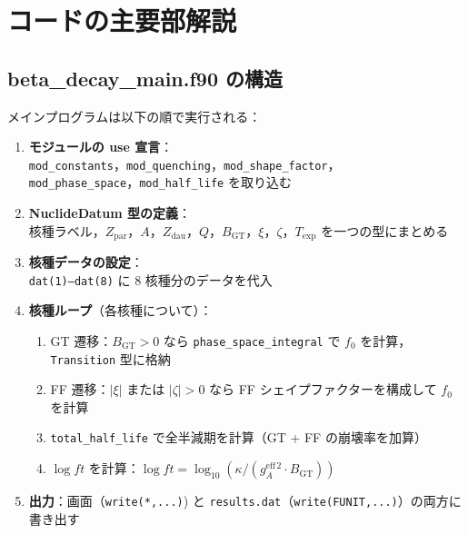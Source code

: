 \documentclass[12pt,a4paper]{ltjsarticle}
\begin{document}
\section{コードの主要部解説}

\subsection{beta\_decay\_main.f90 の構造}

メインプログラムは以下の順で実行される：

\begin{enumerate}
  \item \textbf{モジュールの use 宣言}：\\
        \texttt{mod\_constants}，\texttt{mod\_quenching}，\texttt{mod\_shape\_factor}，\\
        \texttt{mod\_phase\_space}，\texttt{mod\_half\_life} を取り込む

  \item \textbf{NuclideDatum 型の定義}：\\
        核種ラベル，$Z_\text{par}$，$A$，$Z_\text{dau}$，$Q$，$B_\text{GT}$，$\xi$，$\zeta$，$T_\text{exp}$ を一つの型にまとめる

  \item \textbf{核種データの設定}：\\
        \texttt{dat(1)--dat(8)} に 8 核種分のデータを代入

  \item \textbf{核種ループ}（各核種について）：
  \begin{enumerate}
    \item GT 遷移：$B_\text{GT} > 0$ なら \texttt{phase\_space\_integral} で $f_0$ を計算，\texttt{Transition} 型に格納
    \item FF 遷移：$|\xi|$ または $|\zeta| > 0$ なら FF シェイプファクターを構成して $f_0$ を計算
    \item \texttt{total\_half\_life} で全半減期を計算（GT + FF の崩壊率を加算）
    \item $\log ft$ を計算：$\log ft = \log_{10}(\kappa / (g_A^{\text{eff}\,2} \cdot B_\text{GT}))$
  \end{enumerate}

  \item \textbf{出力}：画面（\texttt{write(*,...)}) と \texttt{results.dat}（\texttt{write(FUNIT,...)}）の両方に書き出す
\end{enumerate}
\end{document}
